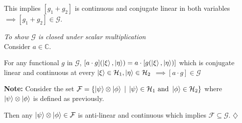 \documentclass[12pt,twoside,fleqn]{report}
\makeatletter
\theoremstyle{thmstyle}
\renewenvironment{proof}[1][\proofname]{\par
\pushQED{\qed}%
\normalfont \topsep6\p@\@plus6\p@\relax
\trivlist
\item[\hskip\labelsep\itshape#1\@addpunct{.}]\mbox{}\par\nobreak\ignorespaces
}{%
    \popQED\endtrivlist\@endpefalse
    }
\newenvironment{note}{\textbf{Note:}}{\hfill\ensuremath{\diamondsuit}}
\makeatother
\begin{document}
\begin{proof}
    This implies $[g_1 + g_2]$ is continuous and conjugate linear in both variables $\implies [g_1 + g_2] \in \mathcal{G}$.



    \emph{To show $\mathcal{G}$ is closed under scalar multiplication} \\
    Consider $a \in \mathbb{C}$.

    For any functional $g$ in $\mathcal{G}$, $[a \cdot g](\ket\xi, \ket\eta) = a \cdot [ g(\ket\xi, \ket\eta) ]$ which is conjugate linear and continuous at every $\ket\xi \in \mathcal{H}_1, \ket\eta \in \mathcal{H}_2$ $\implies [a \cdot g] \in \mathcal{G}$
\end{proof}

\begin{note}
    Consider the set $\mathcal{F} = \{ \ket\psi \otimes \ket\phi \; | \; \ket\psi \in \mathcal{H}_1 \text{ and } \ket\phi \in \mathcal{H}_2 \}$ where $\ket\psi \otimes \ket\phi$ is defined as previously.

    Then any $\ket\psi \otimes \ket\phi \in \mathcal{F}$ is anti-linear and continuous which implies $\mathcal{F} \subseteq \mathcal{G}$.
\end{note}
\end{document}
